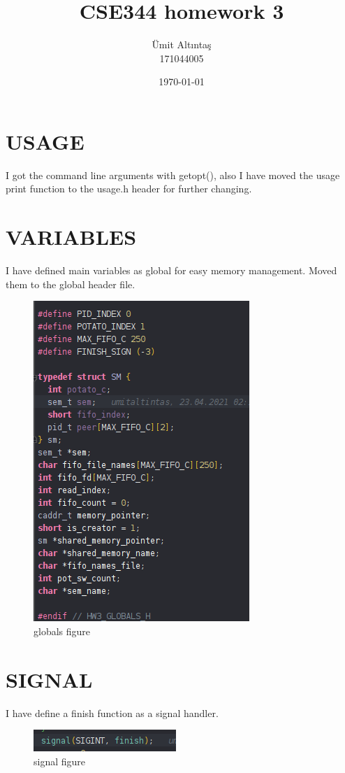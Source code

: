 \documentclass{article}
\title{CSE344 homework 3}
\author{Ümit Altıntaş \\ 171044005}
\date{\today}
\begin{document}
\maketitle
\section{USAGE}
I got the command line arguments with getopt(), also I have moved the usage print function to the usage.h header for further changing.
\section{VARIABLES}
I have defined main variables as global for easy memory management.
Moved them to the global header file.
\begin{figure}[htbp!]
    \centering
    \includegraphics[scale=0.6]{globals.png}
    \caption{globals figure}
    \label{fig:globals}
\end{figure}
\pagebreak

\section{SIGNAL}
I have define a finish function as a signal handler.
\begin{figure}[htbp!]
    \centering
    \includegraphics[scale=1]{signal.png}
    \caption{signal figure}
    \label{fig:signal}
\end{figure}
\end{document}
